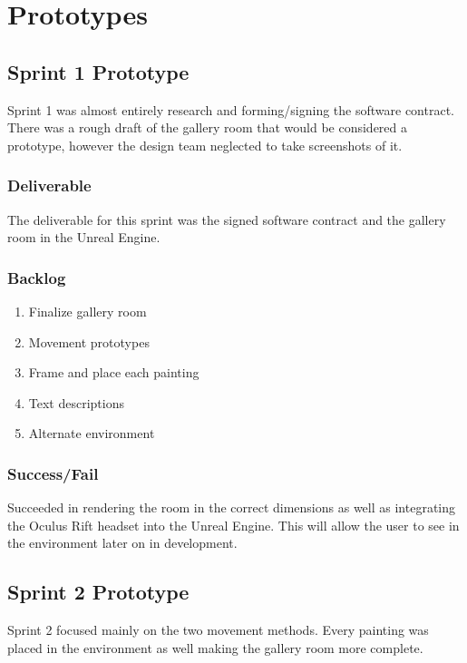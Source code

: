 

\chapter{Prototypes}


\section{Sprint 1 Prototype}
Sprint 1 was almost entirely research and forming/signing the software contract.  There was a rough draft of the gallery room that would be considered a prototype, however the design team neglected to take screenshots of it.
\subsection{Deliverable}
The deliverable for this sprint was the signed software contract and the gallery room in the Unreal Engine.
\subsection{Backlog}
	\begin{enumerate}
	\item Finalize gallery room
	\item Movement prototypes
	\item Frame and place each painting
	\item Text descriptions
	\item Alternate environment
	\end{enumerate}
\subsection{Success/Fail}
Succeeded in rendering the room in the correct dimensions as well as integrating the Oculus Rift headset into the Unreal Engine. This will allow the user to see in the environment later on in development.

\section{Sprint 2 Prototype}
Sprint 2 focused mainly on the two movement methods.  Every painting was placed in the environment as well making the gallery room more complete.  
